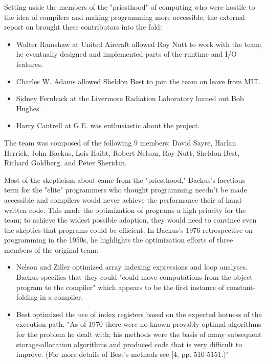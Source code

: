 Setting aside the members of the "priesthood" of computing who were hostile to
the idea of compilers and making programming more accessible, the external
report on \FTN{} brought these contributors into the fold:
\begin{itemize}
  \item Walter Ramshaw at United Aircraft allowed Roy Nutt to work
    with the team; he
    eventually designed and implemented parts of the runtime and I/O features.
  \item Charles W. Adams allowed Sheldon Best to join the team on
    leave from MIT.
  \item Sidney Fernback at the Livermore Radiation Laboratory loaned
    out Bob Hughes.
  \item Harry Cantrell at G.E. was enthusiastic about the project.
\end{itemize}

The team was composed of the following 9 members: David Sayre, Harlan Herrick,
John Backus, Lois Haibt, Robert Nelson, Roy Nutt, Sheldon Best, Richard
Goldberg, and Peter Sheridan.

Most of the skepticism about \FTN{} came from the "priesthood," Backus's
facetious term for the "elite" programmers who thought programming needn't be
made accessible and compilers would never achieve the performance their of
hand-written code. This made the optimization of \FTN{} programs a high
priority for the team; to achieve the widest possible adoption, they would need
to convince even the skeptics that \FTN{} programs could be efficient. In
Backus's 1976 retrospective on programming in the
1950s\cite{Backus_1980_Programming_in_America_in_1950s}, he highlights the
optimization efforts of three members of the original team:

\begin{itemize}
  \item Nelson and Ziller optimized array indexing expressions and
    loop analyses.
    Backus specifies that they could "could move computations from the object
    program to the compiler" which appears to be the first instance of
    constant-folding in a compiler.
  \item Best optimized the use of index registers based on the
    expected hotness of the
    execution path. "As of 1970 there were no known provably optimal
    algorithms for
    the problem he dealt with; his methods were the basis of many subsequent
    storage-allocation algorithms and produced code that is very difficult to
    improve. (For more details of Best's methods see [4, pp. 510-5151.)"
\end{itemize}

